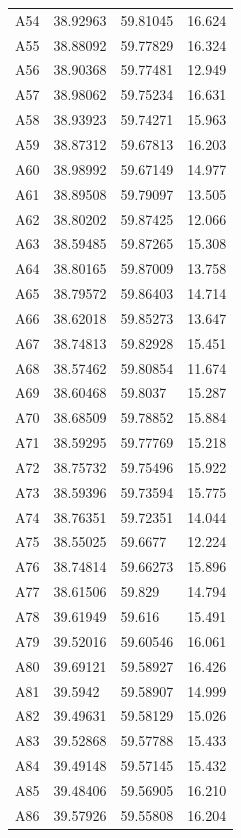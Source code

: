 \documentclass[useAMS,usenatbib]{mn2e}
\begin{document}
\begin{table}
\begin{tabular}{lllc}
	A54 & 38.92963 & 59.81045 & 16.624 \\
	A55 & 38.88092 & 59.77829 & 16.324 \\
	A56 & 38.90368 & 59.77481 & 12.949 \\
	A57 & 38.98062 & 59.75234 & 16.631 \\
	A58 & 38.93923 & 59.74271 & 15.963 \\
	A59 & 38.87312 & 59.67813 & 16.203 \\
	A60 & 38.98992 & 59.67149 & 14.977 \\
	A61 & 38.89508 & 59.79097 & 13.505 \\
	A62 & 38.80202 & 59.87425 & 12.066 \\
	A63 & 38.59485 & 59.87265 & 15.308 \\
	A64 & 38.80165 & 59.87009 & 13.758 \\
	A65 & 38.79572 & 59.86403 & 14.714 \\
	A66 & 38.62018 & 59.85273 & 13.647 \\
	A67 & 38.74813 & 59.82928 & 15.451 \\
	A68 & 38.57462 & 59.80854 & 11.674 \\
	A69 & 38.60468 & 59.8037 & 15.287 \\
	A70 & 38.68509 & 59.78852 & 15.884 \\
	A71 & 38.59295 & 59.77769 & 15.218 \\
	A72 & 38.75732 & 59.75496 & 15.922 \\
	A73 & 38.59396 & 59.73594 & 15.775 \\
	A74 & 38.76351 & 59.72351 & 14.044 \\
	A75 & 38.55025 & 59.6677 & 12.224 \\
	A76 & 38.74814 & 59.66273 & 15.896 \\
	A77 & 38.61506 & 59.829 & 14.794 \\
	A78 & 39.61949 & 59.616 & 15.491 \\
	A79 & 39.52016 & 59.60546 & 16.061 \\
	A80 & 39.69121 & 59.58927 & 16.426 \\
	A81 & 39.5942 & 59.58907 & 14.999 \\
	A82 & 39.49631 & 59.58129 & 15.026 \\
	A83 & 39.52868 & 59.57788 & 15.433 \\
	A84 & 39.49148 & 59.57145 & 15.432 \\
	A85 & 39.48406 & 59.56905 & 16.210 \\
	A86 & 39.57926 & 59.55808 & 16.204 \\

\end{tabular}
\end{table}
\end{document}
